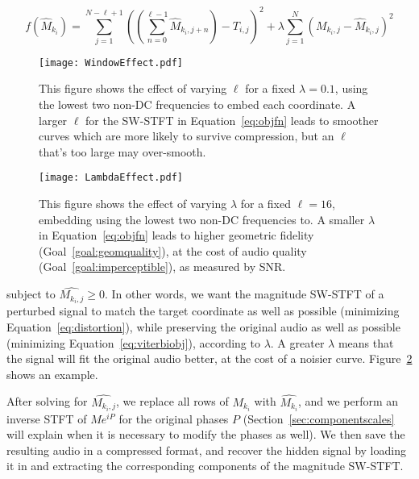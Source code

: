\documentclass[runningheads]{llncs}
\begin{document}
\begin{equation}
  \label{eq:objfn}
  f(\hat{M}_{k_i}) = \sum_{j=1}^{N-\ell+1} \left( \left( \sum_{n = 0}^{\ell-1} \hat{M}_{k_i, j+n} \right) - T_{i, j} \right)^2 + \lambda \sum_{j=1}^N \left( M_{k_i, j} - \hat{M}_{k_i, j} \right)^2
\end{equation}



\begin{figure}
  \centering
  \texttt{[image: WindowEffect.pdf]}
  \caption{This figure shows the effect of varying $\ell$ for a fixed $\lambda=0.1$, using the lowest two non-DC frequencies to embed each coordinate.  A larger $\ell$ for the SW-STFT in Equation~\ref{eq:objfn} leads to smoother curves which are more likely to survive compression, but an $\ell$ that's too large may over-smooth.}
  \label{fig:WindowEffect}
\end{figure}

\begin{figure}
  \centering
  \texttt{[image: LambdaEffect.pdf]}
  \caption{This figure shows the effect of varying $\lambda$ for a fixed $\ell=16$, embedding using the lowest two non-DC frequencies to.  A smaller $\lambda$ in Equation~\ref{eq:objfn} leads to higher geometric fidelity (Goal~\ref{goal:geomquality}), at the cost of audio quality (Goal~\ref{goal:imperceptible}), as measured by SNR.}
  \label{fig:LambdaEffect}
\end{figure}



subject to $\hat{M_{k_i, j}} \geq 0$.  In other words, we want the magnitude SW-STFT of a perturbed signal to match the target coordinate as well as possible (minimizing Equation~\ref{eq:distortion}), while preserving the original audio as well as possible (minimizing Equation~\ref{eq:viterbiobj}), according to $\lambda$.  A greater $\lambda$ means that the signal will fit the original audio better, at the cost of a noisier curve.  Figure~\ref{fig:LambdaEffect} shows an example.

After solving for $\hat{M_{k_i, j}}$, we replace all rows of $M_{k_i}$ with $\hat{M_{k_i}}$, and we perform an inverse STFT of $M e^{i P}$ for the original phases $P$ (Section~\ref{sec:componentscales} will explain when it is necessary to modify the phases as well).  We then save the resulting audio in a compressed format, and recover the hidden signal by loading it in and extracting the corresponding components of the magnitude SW-STFT.
\end{document}
